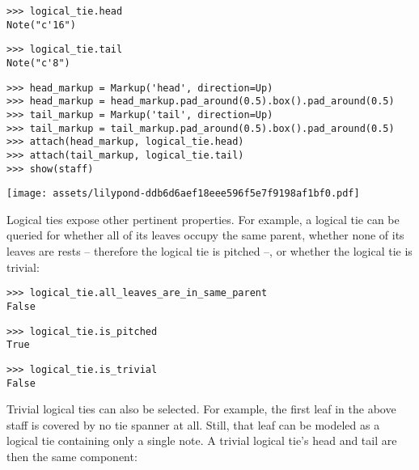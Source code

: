\begin{abjadbookoutput}
\begin{singlespacing}
\vspace{-0.5\baselineskip}
\begin{verbatim}
>>> logical_tie.head
Note("c'16")
\end{verbatim}
\begin{verbatim}
>>> logical_tie.tail
Note("c'8")
\end{verbatim}
\begin{verbatim}
>>> head_markup = Markup('head', direction=Up)
>>> head_markup = head_markup.pad_around(0.5).box().pad_around(0.5)
>>> tail_markup = Markup('tail', direction=Up)
>>> tail_markup = tail_markup.pad_around(0.5).box().pad_around(0.5)
>>> attach(head_markup, logical_tie.head)
>>> attach(tail_markup, logical_tie.tail)
>>> show(staff)
\end{verbatim}
\noindent\texttt{[image: assets/lilypond-ddb6d6aef18eee596f5e7f9198af1bf0.pdf]}
\end{singlespacing}
\end{abjadbookoutput}

\noindent Logical ties expose other pertinent properties. For example, a
logical tie can be queried for whether all of its leaves occupy the same
parent, whether none of its leaves are rests -- therefore the logical tie is
pitched --, or whether the logical tie is trivial:

\begin{comment}
<abjad>
logical_tie.all_leaves_are_in_same_parent
logical_tie.is_pitched
logical_tie.is_trivial
</abjad>
\end{comment}

\begin{abjadbookoutput}
\begin{singlespacing}
\vspace{-0.5\baselineskip}
\begin{verbatim}
>>> logical_tie.all_leaves_are_in_same_parent
False
\end{verbatim}
\begin{verbatim}
>>> logical_tie.is_pitched
True
\end{verbatim}
\begin{verbatim}
>>> logical_tie.is_trivial
False
\end{verbatim}
\end{singlespacing}
\end{abjadbookoutput}

\noindent Trivial logical ties can also be selected. For example, the first
leaf in the above staff is covered by no tie spanner at all. Still, that leaf
can be modeled as a logical tie containing only a single note. A trivial
logical tie's head and tail are then the same component:

